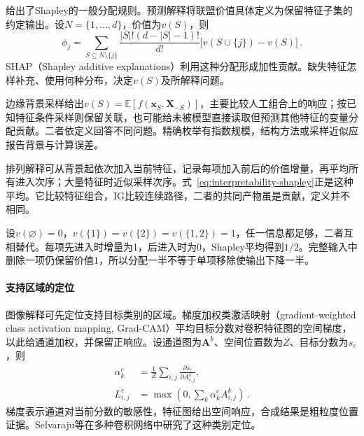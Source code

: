 给出了Shapley的一般分配规则。预测解释将联盟价值具体定义为保留特征子集的约定输出。设$N=\{1,\ldots,d\}$，价值为$v(S)$，则
\begin{equation}
 \phi_j=\sum_{S\subseteq N\setminus\{j\}}
 \frac{|S|!(d-|S|-1)!}{d!}
 \bigl[v(S\cup\{j\})-v(S)\bigr]\, .
 \label{eq:interpretability-shapley}
\end{equation}
SHAP（Shapley additive explanations）利用这种分配形成加性贡献。缺失特征怎样补充、使用何种分布，决定$v(S)$及所解释问题。

边缘背景采样给出$v(S)=\mathbb E[f(\bm x_S,\bm X_{-S})]$，主要比较人工组合上的响应；按已知特征条件采样则保留关联，也可能给未被模型直接读取但预测其他特征的变量分配贡献。二者依定义回答不同问题。精确枚举有指数规模，结构方法或采样近似应报告背景与计算误差。

排列解释可从背景起依次加入当前特征，记录每项加入前后的价值增量，再平均所有进入次序；大量特征时近似采样次序。式~\eqref{eq:interpretability-shapley}正是这种平均。它比较特征组合，IG比较连续路径，二者的共同产物虽是贡献，定义并不相同。

\begin{example}[共同信息的贡献分配]
\label{ex:interpretability-redundancy}
设$v(\varnothing)=0$，$v(\{1\})=v(\{2\})=v(\{1,2\})=1$，任一信息都足够，二者互相替代。每项先进入时增量为1，后进入时为0，Shapley平均得到$1/2$。完整输入中删除一项仍保留价值1，所以分配一半不等于单项移除使输出下降一半。
\end{example}

\paragraph{支持区域的定位}

图像解释可先定位支持目标类别的区域。梯度加权类激活映射（gradient-weighted class activation mapping, Grad-CAM）平均目标分数对卷积特征图的空间梯度，以此给通道加权，并保留正响应。设通道图为$\bm A^k$、空间位置数为$Z$、目标分数为$s_c$，则
\begin{equation}
 \begin{aligned}
 \alpha_k^c&=\frac{1}{Z}\sum_{i,j}
 \frac{\partial s_c}{\partial A^k_{i,j}},\\
 L^c_{i,j}&=\max\!\left(0,\sum_k\alpha_k^c A^k_{i,j}\right)\, .
 \end{aligned}
 \label{eq:interpretability-gradcam}
\end{equation}
梯度表示通道对当前分数的敏感性，特征图给出空间响应，合成结果是粗粒度位置证据。Selvaraju等在多种卷积网络中研究了这种类别定位。

